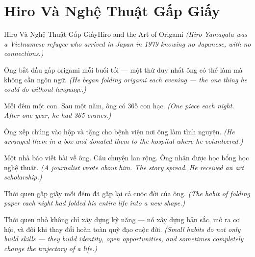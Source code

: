 \section{Hiro Và Nghệ Thuật Gấp Giấy}
\begin{truyen}{Hiro Và Nghệ Thuật Gấp Giấy}{Hiro and the Art of Origami}
\textit{(Hiro Yamagata was a Vietnamese refugee who arrived in Japan in 1979 knowing no Japanese, with no connections.)}

Ông bắt đầu gấp origami mỗi buổi tối — một thứ duy nhất ông có thể làm mà không cần ngôn ngữ.
\textit{(He began folding origami each evening — the one thing he could do without language.)}

Mỗi đêm một con. Sau một năm, ông có 365 con hạc.
\textit{(One piece each night. After one year, he had 365 cranes.)}

Ông xếp chúng vào hộp và tặng cho bệnh viện nơi ông làm tình nguyện.
\textit{(He arranged them in a box and donated them to the hospital where he volunteered.)}

Một nhà báo viết bài về ông. Câu chuyện lan rộng. Ông nhận được học bổng học nghệ thuật.
\textit{(A journalist wrote about him. The story spread. He received an art scholarship.)}

Thói quen gấp giấy mỗi đêm đã gấp lại cả cuộc đời của ông.
\textit{(The habit of folding paper each night had folded his entire life into a new shape.)}

\end{truyen}

\begin{baihoc}
Thói quen nhỏ không chỉ xây dựng kỹ năng — nó xây dựng bản sắc, mở ra cơ hội, và đôi khi thay đổi hoàn toàn quỹ đạo cuộc đời.
\textit{(Small habits do not only build skills — they build identity, open opportunities, and sometimes completely change the trajectory of a life.)}
\end{baihoc}
\ngancach

